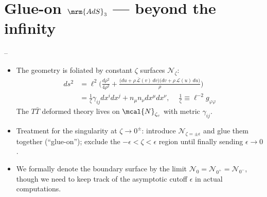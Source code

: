 \documentclass[10pt]{article}
\renewenvironment{frame}[1]%
	{\section*{#1}}%
	{\clearpage}
\newcommand{\pause}{}
\newcommand{\TTbar}{\texorpdfstring{\ensuremath{T\bar{T}}}{TTbar}\xspace}
\begin{document}
\begin{frame}{Glue-on $\mrm{AdS}_3$ --- beyond the infinity}{%
	\textcite{Apolo:2023vnm} -- 
}
\begin{itemize}
\item The geometry is foliated by constant $\zeta$ surfaces ${\mathcal N}_\zeta$:
	\begin{equation}
	\begin{aligned}
		ds^2 
		&= \ell^2 \bigg( \frac{d\rho^2}{4 \rho^2} + \frac{ \big( du + \rho \, \mathcal {\bar L}(v)\, dv \big) \big( dv + \rho \, \mathcal L(u)\, du \big) }{\rho} \bigg) \\
		&= \frac{1}{\zeta} \gamma_{ij}dx^i dx^j+n_\mu n_\nu dx^\mu dx^\nu,\ \quad
	\frac{1}{\zeta} \equiv \ell^{-2} g_{\varphi\varphi}
	\end{aligned}
	\end{equation}
	The \TTbar deformed theory lives on $\mcal{N}_{\zeta_c}$ with metric $\gamma_{ij}$.
	
\pause
\item Treatment for the singularity at $\zeta\to 0^\pm$: introduce $\mathcal N_{\zeta={\pm\epsilon}}$ and glue them together (``glue-on'');
	exclude the $-\epsilon < \zeta < \epsilon$ region until finally sending $\epsilon \to 0$. 
\item We formally denote the boundary surface by the limit $\mathcal N_{0}=\mathcal N_{0^+}=\mathcal N_{0^-}$, though we need to keep track of the asymptotic cutoff $\epsilon$ in actual computations.
\end{itemize}
\end{frame}

\newcommand{\stateGlueon}{\ensuremath{
	\textrm{Cutoff / \textit{glue-on} $\mrm{AdS}_{d+1}$ Gravity}
	\ \equiv\ %
	\textrm{\TTbar deformed $\mrm{CFT}_{d}$ at $\mcal{N}_{\zeta_c}$}\ \,
}}
\end{document}
